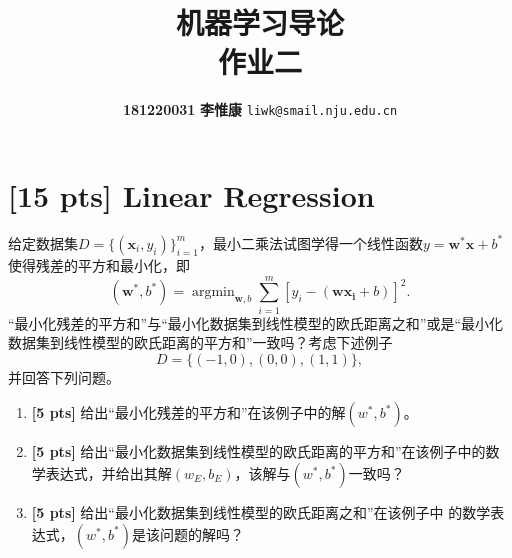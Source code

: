 \documentclass[a4paper,UTF8]{article}
\numberwithin{equation}{section}
\begin{document}
\title{\textbf{机器学习导论\\
作业二}}
\author{\textbf{181220031} \textbf{李惟康} \texttt{liwk@smail.nju.edu.cn}}
\maketitle

\section{[15 pts] Linear Regression}
给定数据集$D=\{(\mathbf{x}_i,y_i)\}_{i=1}^m$，最小二乘法试图学得一个线性函数$y=\mathbf{w^*}\mathbf{x}+b^*$使得残差的平方和最小化，即
\begin{equation}
	(\mathbf{w^*},b^*) = \mathop{\arg\min}_{\mathbf{w},b} \sum_{i=1}^m [y_i-(\mathbf{w}\mathbf{x_i}+b)]^2 . 
\end{equation}
“最小化残差的平方和”与“最小化数据集到线性模型的欧氏距离之和”或是“最小化数据集到线性模型的欧氏距离的平方和”一致吗？考虑下述例子
\begin{equation}
	D = \{ (-1,0) , (0,0) , (1,1) \} , 
\end{equation}
并回答下列问题。

\begin{enumerate}[(1)]
	\item \textbf{[5 pts]} 给出“最小化残差的平方和”在该例子中的解$(w^*,b^*)$。
	\item \textbf{[5 pts]} 给出“最小化数据集到线性模型的欧氏距离的平方和”在该例子中的数学表达式，并给出其解$(w_{E},b_{E})$，该解与$(w^*,b^*)$一致吗？
	\item \textbf{[5 pts]} 给出“最小化数据集到线性模型的欧氏距离之和”在该例子中
	的数学表达式，$(w^*,b^*)$是该问题的解吗？
\end{enumerate}
\end{document}
